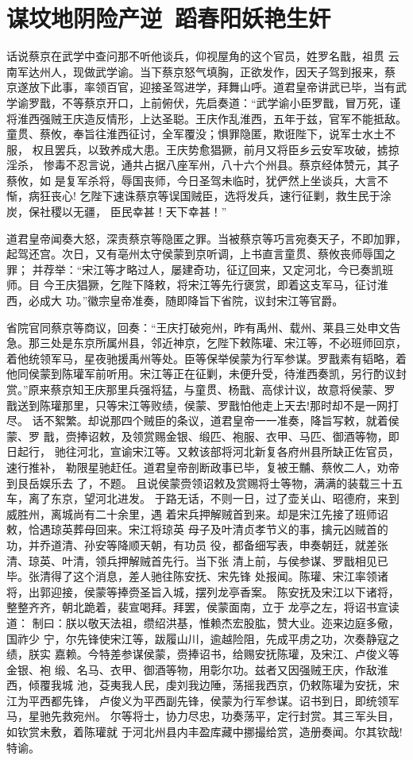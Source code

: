 \chapter{谋坟地阴险产逆~蹈春阳妖艳生奸}

话说蔡京在武学中查问那不听他谈兵，仰视屋角的这个官员，姓罗名戬，祖贯
云南军达州人，现做武学谕。当下蔡京怒气填胸，正欲发作，因天子驾到报来，蔡
京遂放下此事，率领百官，迎接圣驾进学，拜舞山呼。道君皇帝讲武已毕，当有武
学谕罗戬，不等蔡京开口，上前俯伏，先启奏道：“武学谕小臣罗戬，冒万死，谨
将淮西强贼王庆造反情形，上达圣聪。王庆作乱淮西，五年于兹，官军不能抵敌。
童贯、蔡攸，奉旨往淮西征讨，全军覆没；惧罪隐匿，欺诳陛下，说军士水土不服，
权且罢兵，以致养成大患。王庆势愈猖獗，前月又将臣乡云安军攻破，掳掠淫杀，
惨毒不忍言说，通共占据八座军州，八十六个州县。蔡京经体赞元，其子蔡攸，如
是复军杀将，辱国丧师，今日圣驾未临时，犹俨然上坐谈兵，大言不惭，病狂丧心!
乞陛下速诛蔡京等误国贼臣，选将发兵，速行征剿，救生民于涂炭，保社稷以无疆，
臣民幸甚！天下幸甚！”

道君皇帝闻奏大怒，深责蔡京等隐匿之罪。当被蔡京等巧言宛奏天子，不即加罪，
起驾还宫。次日，又有亳州太守侯蒙到京听调，上书直言童贯、蔡攸丧师辱国之罪；
并荐举：“宋江等才略过人，屡建奇功，征辽回来，又定河北，今已奏凯班师。目
今王庆猖獗，乞陛下降敕，将宋江等先行褒赏，即着这支军马，征讨淮西，必成大
功。”徽宗皇帝准奏，随即降旨下省院，议封宋江等官爵。

省院官同蔡京等商议，回奏：“王庆打破宛州，昨有禹州、载州、莱县三处申文告
急。那三处是东京所属州县，邻近神京，乞陛下敕陈瓘、宋江等，不必班师回京，
着他统领军马，星夜驰援禹州等处。臣等保举侯蒙为行军参谋。罗戬素有韬略，着
他同侯蒙到陈瓘军前听用。宋江等正在征剿，未便升受，待淮西奏凯，另行酌议封
赏。”原来蔡京知王庆那里兵强将猛，与童贯、杨戬、高俅计议，故意将侯蒙、罗
戬送到陈瓘那里，只等宋江等败绩，侯蒙、罗戬怕他走上天去!那时却不是一网打
尽。
话不絮繁。却说那四个贼臣的条议，道君皇帝一一准奏，降旨写敕，就着侯蒙、罗
戬，赍捧诏敕，及领赏赐金银、缎匹、袍服、衣甲、马匹、御酒等物，即日起行，
驰往河北，宣谕宋江等。又敕该部将河北新复各府州县所缺正佐官员，速行推补，
勒限星驰赶任。道君皇帝剖断政事已毕，复被王黼、蔡攸二人，劝帝到艮岳娱乐去
了，不题。
且说侯蒙赍领诏敕及赏赐将士等物，满满的装载三十五车，离了东京，望河北进发。
于路无话，不则一日，过了壶关山、昭德府，来到威胜州，离城尚有二十余里，遇
着宋兵押解贼首到来。却是宋江先接了班师诏敕，恰遇琼英葬母回来。宋江将琼英
母子及叶清贞孝节义的事，擒元凶贼首的功，并乔道清、孙安等降顺天朝，有功员
役，都备细写表，申奏朝廷，就差张清、琼英、叶清，领兵押解贼首先行。当下张
清上前，与侯参谋、罗戬相见已毕。张清得了这个消息，差人驰往陈安抚、宋先锋
处报闻。陈瓘、宋江率领诸将，出郭迎接，侯蒙等捧赍圣旨入城，摆列龙亭香案。
陈安抚及宋江以下诸将，整整齐齐，朝北跪着，裴宣喝拜。拜罢，侯蒙面南，立于
龙亭之左，将诏书宣读道：
制曰：朕以敬天法祖，缵绍洪基，惟赖杰宏股肱，赞大业。迩来边庭多儆，国祚少
宁，尔先锋使宋江等，跋履山川，逾越险阻，先成平虏之功，次奏静寇之绩，朕实
嘉赖。今特差参谋侯蒙，赍捧诏书，给赐安抚陈瓘，及宋江、卢俊义等金银、袍
缎、名马、衣甲、御酒等物，用彰尔功。兹者又因强贼王庆，作敌淮西，倾覆我城
池，芟夷我人民，虔刘我边陲，荡摇我西京，仍敕陈瓘为安抚，宋江为平西都先锋，
卢俊义为平西副先锋，侯蒙为行军参谋。诏书到日，即统领军马，星驰先救宛州。
尔等将士，协力尽忠，功奏荡平，定行封赏。其三军头目，如钦赏未敷，着陈瓘就
于河北州县内丰盈库藏中挪撮给赏，造册奏闻。尔其钦哉!特谕。

